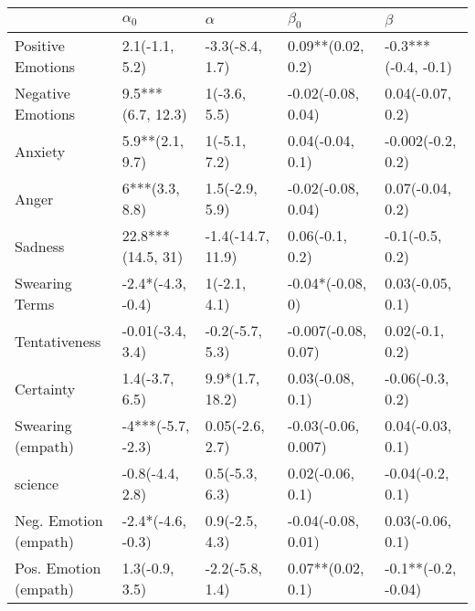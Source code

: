 \begin{tabular}{lllll}
\toprule
{} &         $\alpha_0$ &           $\alpha$ &            $\beta_0$ &              $\beta$ \\
\midrule
Positive Emotions     &     2.1(-1.1, 5.2) &    -3.3(-8.4, 1.7) &    0.09**(0.02, 0.2) &  -0.3***(-0.4, -0.1) \\
Negative Emotions     &  9.5***(6.7, 12.3) &       1(-3.6, 5.5) &   -0.02(-0.08, 0.04) &     0.04(-0.07, 0.2) \\
Anxiety               &    5.9**(2.1, 9.7) &       1(-5.1, 7.2) &     0.04(-0.04, 0.1) &    -0.002(-0.2, 0.2) \\
Anger                 &     6***(3.3, 8.8) &     1.5(-2.9, 5.9) &   -0.02(-0.08, 0.04) &     0.07(-0.04, 0.2) \\
Sadness               &  22.8***(14.5, 31) &  -1.4(-14.7, 11.9) &      0.06(-0.1, 0.2) &      -0.1(-0.5, 0.2) \\
Swearing Terms        &  -2.4*(-4.3, -0.4) &       1(-2.1, 4.1) &     -0.04*(-0.08, 0) &     0.03(-0.05, 0.1) \\
Tentativeness         &   -0.01(-3.4, 3.4) &    -0.2(-5.7, 5.3) &  -0.007(-0.08, 0.07) &      0.02(-0.1, 0.2) \\
Certainty             &     1.4(-3.7, 6.5) &    9.9*(1.7, 18.2) &     0.03(-0.08, 0.1) &     -0.06(-0.3, 0.2) \\
Swearing (empath)     &  -4***(-5.7, -2.3) &    0.05(-2.6, 2.7) &  -0.03(-0.06, 0.007) &     0.04(-0.03, 0.1) \\
science               &    -0.8(-4.4, 2.8) &     0.5(-5.3, 6.3) &     0.02(-0.06, 0.1) &     -0.04(-0.2, 0.1) \\
Neg. Emotion (empath) &  -2.4*(-4.6, -0.3) &     0.9(-2.5, 4.3) &   -0.04(-0.08, 0.01) &     0.03(-0.06, 0.1) \\
Pos. Emotion (empath) &     1.3(-0.9, 3.5) &    -2.2(-5.8, 1.4) &    0.07**(0.02, 0.1) &  -0.1**(-0.2, -0.04) \\
\bottomrule
\end{tabular}
